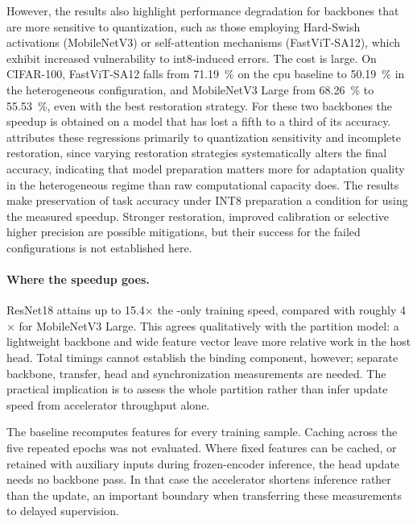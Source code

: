 However, the results also highlight performance degradation for backbones that are more sensitive to quantization, such as those employing Hard-Swish activations (MobileNetV3) or self-attention mechanisms (FastViT-SA12), which exhibit increased vulnerability to \gls{int8}-induced errors. The cost is large. On CIFAR-100, FastViT-SA12 falls from \SI{71.19}{\percent} on the \gls{cpu} baseline to \SI{50.19}{\percent} in the heterogeneous configuration, and MobileNetV3 Large from \SI{68.26}{\percent} to \SI{55.53}{\percent}, even with the best restoration strategy. For these two backbones the speedup is obtained on a model that has lost a fifth to a third of its accuracy.  attributes these regressions primarily to quantization sensitivity and incomplete restoration, since varying restoration strategies systematically alters the final accuracy, indicating that model preparation matters more for adaptation quality in the heterogeneous regime than raw computational capacity does. The results make preservation of task accuracy under INT8 preparation a condition for using the measured speedup. Stronger restoration, improved calibration or selective higher precision are possible mitigations, but their success for the failed configurations is not established here.

\paragraph{Where the speedup goes.} ResNet18 attains up to \num{15.4}$\times$ the -only training speed, compared with roughly \num{4}$\times$ for MobileNetV3 Large. This agrees qualitatively with the partition model: a lightweight backbone and wide feature vector leave more relative work in the host head. Total timings cannot establish the binding component, however; separate backbone, transfer, head and synchronization measurements are needed. The practical implication is to assess the whole partition rather than infer update speed from accelerator throughput alone.

The baseline recomputes features for every training sample. Caching across the five repeated epochs was not evaluated. Where fixed features can be cached, or retained with auxiliary inputs during frozen-encoder inference, the head update needs no backbone pass. In that case the accelerator shortens inference rather than the update, an important boundary when transferring these measurements to delayed supervision.

